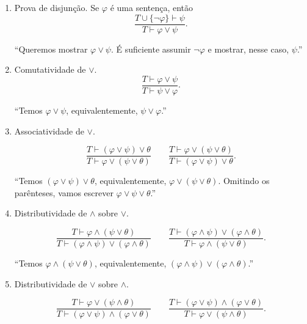 \begin{metaproposition}
\begin{enumerate}[label=(\roman*)]
        ``Queremos mostrar $\psi$.
        Dividimos em casos: suponha $\varphi$ (...) então $\psi$; suponha $\neg\varphi$ (...) então $\psi$. Logo, $\psi$.''

        \item Prova de disjunção. Se $\varphi$ é uma sentença, então
        \[
            \frac{T\cup\{\neg\varphi\}\vdash \psi}
                 {T\vdash \varphi\lor\psi}.
        \]

        ``Queremos mostrar $\varphi\lor\psi$.
        É suficiente assumir $\neg\varphi$ e mostrar, nesse caso, $\psi$.''

        \item Comutatividade de $\lor$.
        \[
            \frac{T\vdash \varphi\lor\psi}
                 {T\vdash \psi\lor\varphi}.
        \]

        ``Temos $\varphi\lor\psi$, equivalentemente, $\psi\lor\varphi$.''

        \item Associatividade de $\lor$.
        
        \[
            \frac{T\vdash (\varphi\lor\psi)\lor\theta}
                 {T\vdash \varphi\lor(\psi\lor\theta)}
            \qquad
            \frac{T\vdash \varphi\lor(\psi\lor\theta)}
                 {T\vdash (\varphi\lor\psi)\lor\theta}.
        \]

        ``Temos $(\varphi\lor\psi)\lor\theta$, equivalentemente, $\varphi\lor(\psi\lor\theta)$. Omitindo os parênteses, vamos escrever $\varphi\lor\psi\lor\theta$.''

        \item Distributividade de $\land$ sobre $\lor$.
        
        \[
            \frac{T\vdash \varphi\land(\psi\lor\theta)}
                 {T\vdash (\varphi\land\psi)\lor(\varphi\land\theta)}
            \qquad
            \frac{T\vdash (\varphi\land\psi)\lor(\varphi\land\theta)}
                 {T\vdash \varphi\land(\psi\lor\theta)}.
        \]

        ``Temos $\varphi\land(\psi\lor\theta)$, equivalentemente, $(\varphi\land\psi)\lor(\varphi\land\theta)$.''

        \item Distributividade de $\lor$ sobre $\land$.
        
        \[
            \frac{T\vdash \varphi\lor(\psi\land\theta)}
                 {T\vdash (\varphi\lor\psi)\land(\varphi\lor\theta)}
            \qquad
            \frac{T\vdash (\varphi\lor\psi)\land(\varphi\lor\theta)}
                 {T\vdash \varphi\lor(\psi\land\theta)}.
        \]


\end{enumerate}
\end{metaproposition}
